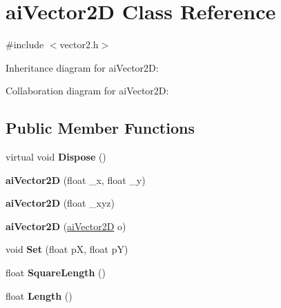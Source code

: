 \hypertarget{structai_vector2_d}{\section{ai\+Vector2\+D Class Reference}
\label{structai_vector2_d}
}


{\ttfamily \#include $<$vector2.\+h$>$}



Inheritance diagram for ai\+Vector2\+D\+:


Collaboration diagram for ai\+Vector2\+D\+:
\subsection*{Public Member Functions}
\begin{DoxyCompactItemize}
\item 
\hypertarget{structai_vector2_d_a7ae6d505e522a2b9881c4fb1dcd56a30}{virtual void {\bfseries Dispose} ()}\label{structai_vector2_d_a7ae6d505e522a2b9881c4fb1dcd56a30}

\item 
\hypertarget{structai_vector2_d_a82bef77dcce7ade6931026bbadcbe09e}{{\bfseries ai\+Vector2\+D} (float \+\_\+x, float \+\_\+y)}\label{structai_vector2_d_a82bef77dcce7ade6931026bbadcbe09e}

\item 
\hypertarget{structai_vector2_d_a35a637d01b95b91cc4532261376ccfa9}{{\bfseries ai\+Vector2\+D} (float \+\_\+xyz)}\label{structai_vector2_d_a35a637d01b95b91cc4532261376ccfa9}

\item 
\hypertarget{structai_vector2_d_ace010b049b8ec762eb27f1a88e924c3c}{{\bfseries ai\+Vector2\+D} (\hyperlink{structai_vector2_d}{ai\+Vector2\+D} o)}\label{structai_vector2_d_ace010b049b8ec762eb27f1a88e924c3c}

\item 
\hypertarget{structai_vector2_d_a9fba558ffed7a68f6f4ae8e01dfe5e8c}{void {\bfseries Set} (float p\+X, float p\+Y)}\label{structai_vector2_d_a9fba558ffed7a68f6f4ae8e01dfe5e8c}

\item 
\hypertarget{structai_vector2_d_ac4ccb3a470158764d23c049fcaf063e8}{float {\bfseries Square\+Length} ()}\label{structai_vector2_d_ac4ccb3a470158764d23c049fcaf063e8}

\item 
\hypertarget{structai_vector2_d_a94a74f304943a40d48abb213dd8c5f85}{float {\bfseries Length} ()}\label{structai_vector2_d_a94a74f304943a40d48abb213dd8c5f85}


\end{DoxyCompactItemize}
